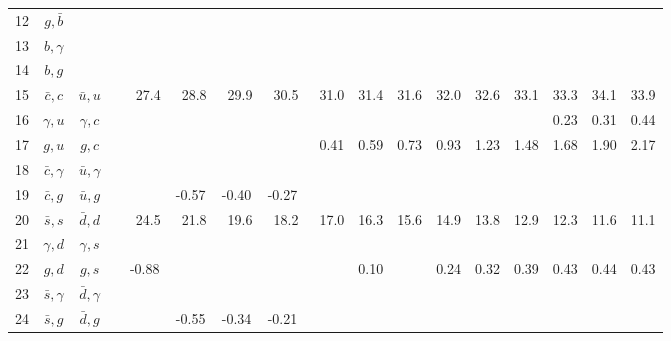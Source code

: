 \begin{tabular}{rcccccccccccccccc}
  12 & $g,\bar b$       &                  &                 &       &       &       &       &       &      &      &      &      &      &      &      &      \\
  13 & $b,\gamma$       &                  &                 &       &       &       &       &       &      &      &      &      &      &      &      &      \\
  14 & $b,g$            &                  &                 &       &       &       &       &       &      &      &      &      &      &      &      &      \\
  15 & $\bar c,c$       & $\bar u,u$       &                 &\ 27.4 &\ 28.8 &\ 29.9 &\ 30.5 &\ 31.0 & 31.4 & 31.6 & 32.0 & 32.6 & 33.1 & 33.3 & 34.1 & 33.9 \\
  16 & $\gamma, u$      & $\gamma, c$      &                 &       &       &       &       &       &      &      &      &      &      & 0.23 & 0.31 & 0.44 \\
  17 & $g,u$            & $g,c$            &                 &       &       &       &       &\ 0.41 & 0.59 & 0.73 & 0.93 & 1.23 & 1.48 & 1.68 & 1.90 & 2.17 \\
  18 & $\bar c,\gamma$  & $\bar u,\gamma$  &                 &       &       &       &       &       &      &      &      &      &      &      &      &      \\
  19 & $\bar c, g$      & $\bar u, g$      &                 &       &-0.57  & -0.40 & -0.27 &       &      &      &      &      &      &      &      &      \\
  20 & $\bar s, s$      & $\bar d, d$      &                 &\ 24.5 &\ 21.8 &\ 19.6 &\ 18.2 &\ 17.0 & 16.3 & 15.6 & 14.9 & 13.8 & 12.9 & 12.3 & 11.6 & 11.1 \\
  21 & $\gamma, d$      & $\gamma, s$      &                 &       &       &       &       &       &      &      &      &      &      &      &      &      \\
  22 & $g,d$            & $g,s$            &                 & -0.88 &       &       &       &       & 0.10 &      & 0.24 & 0.32 & 0.39 & 0.43 & 0.44 & 0.43 \\
  23 & $\bar s,\gamma$  & $\bar d,\gamma$  &                 &       &       &       &       &       &      &      &      &      &      &      &      &      \\
  24 & $\bar s,g$       & $\bar d, g$      &                 &       &-0.55  & -0.34 & -0.21 &       &      &      &      &      &      &      &      &      \\

\end{tabular}
